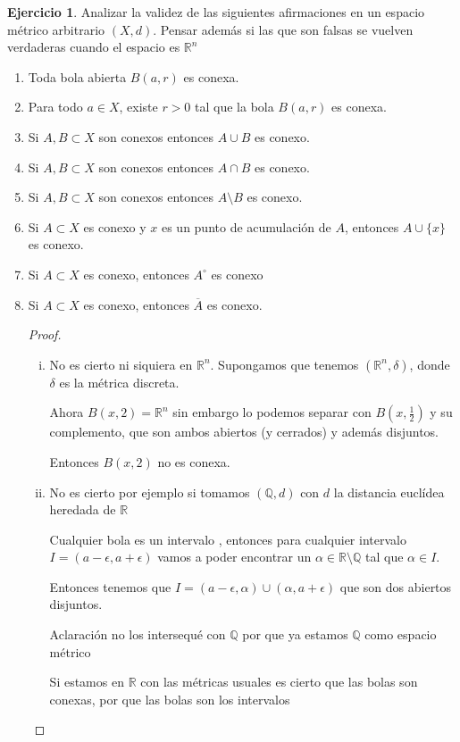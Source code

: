 \documentclass[11pt]{report}
\newcommand{\Q}{\mathbb{Q}}
\newcommand{\R}{\mathbb{R}}
\newcommand{\ol}{\overline}
\theoremstyle{definition}
\newtheorem{ej}{Ejercicio}
\begin{document}
\begin{ej}
	Analizar la validez de las siguientes afirmaciones en un espacio métrico arbitrario $(X,d)$. Pensar además si las que son falsas se vuelven verdaderas cuando el espacio es $\R^n$
\begin{enumerate}
	\item Toda bola abierta $B(a,r)$ es conexa.
	\item Para todo $a \in X$, existe $r >0$ tal que la bola $B(a,r)$ es conexa.
	\item Si $A,B \subset X$ son conexos entonces $A \cup B$ es conexo.
	\item Si $A,B \subset X$ son conexos entonces $A \cap B$ es conexo.
	\item Si $A,B \subset X$ son conexos entonces $A\setminus B$ es conexo.
	\item Si $A \subset X$ es conexo y $x$ es un punto de acumulación de $A$, entonces $A \cup \{x\}$ es conexo.
	\item Si $A \subset X$ es conexo, entonces $A^{\circ}$ es conexo
	\item Si $A \subset X$ es conexo, entonces $\ol A$ es conexo.
\begin{proof}
	\begin{enumerate}[i.]
		\item No es cierto ni siquiera en $\R^n$. Supongamos que tenemos $(\R^n,\delta)$, donde $\delta$ es la métrica discreta.

			Ahora $B(x,2) = \R^n$ sin embargo lo podemos separar con $B(x,\frac{1}{2})$ y su complemento, que son ambos abiertos (y cerrados) y además disjuntos. 

			Entonces $B(x,2)$ no es conexa.

		\item No es cierto por ejemplo si tomamos $(\Q,d)$ con $d$ la distancia euclídea heredada de $\R$

			Cualquier bola es un intervalo , entonces para cualquier intervalo $I = (a-\epsilon,a+\epsilon)$ vamos a poder encontrar un $\alpha \in \R \setminus \Q$ tal que $\alpha \in I$.

			Entonces tenemos que $I = (a-\epsilon,\alpha) \cup (\alpha , a +\epsilon)$ que son dos abiertos disjuntos.

			Aclaración no los intersequé con $\Q$ por que ya estamos $\Q$ como espacio métrico 

			Si estamos en $\R$ con las métricas usuales es cierto que las bolas son conexas, por que las bolas son los intervalos


\end{enumerate}
\end{proof}
\end{enumerate}
\end{ej}
\end{document}
